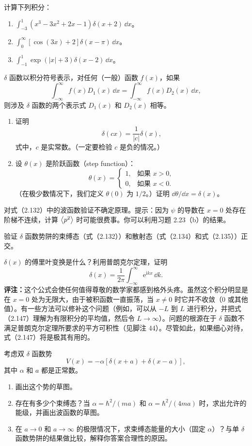计算下列积分：
\begin{enumerate}
\item $\displaystyle\int_{-3}^{1}(x^3-3x^2+2x-1)\delta(x+2)\,\dd x$。
\item $\displaystyle\int_0^{\infty}[\cos(3x)+2]\delta(x-\pi)\,\dd x$。
\item $\displaystyle\int_{-1}^{1}\exp(|x|+3)\delta(x-2)\,\dd x$。
\end{enumerate}
\vfill

$\delta$ 函数以积分符号表示，对任何（一般）函数 $f(x)$，如果
\[
\int_{-\infty}^{\infty}f(x)D_1(x)\,\dd x
=\int_{-\infty}^{\infty}f(x)D_2(x)\,\dd x,
\]
则涉及 $\delta$ 函数的两个表示式 $D_1(x)$ 和 $D_2(x)$ 相等。
\begin{enumerate}
\item 证明
\[
\delta(cx)=\frac{1}{|c|}\delta(x),
\]
式中，$c$ 是实常数。（一定要检验 $c$ 是负的情况。）
\item 设 $\theta(x)$ 是阶跃函数（step function）：
\[
\theta(x)=\begin{cases}1,&\text{如果 }x>0,\\0,&\text{如果 }x<0.\end{cases}
\]
（在极少数情况下，我们定义 $\theta(0)$ 为 $1/2$。）证明 $\dd\theta/\dd x=\delta(x)$。
\end{enumerate}
\vfill

对式（2.132）中的波函数验证不确定原理。提示：因为 $\psi$ 的导数在 $x=0$ 处存在阶梯不连续，计算 $\left\langle p^2\right\rangle$ 时可能很费事。你可以利用习题 2.23（b）的结果。
\vfill

验证 $\delta$ 函数势阱的束缚态（式（2.132））和散射态（式（2.134）和式（2.135））正交。
\vfill

$\delta(x)$ 的傅里叶变换是什么？利用普朗克尔定理，证明
\[
\delta(x)=\frac{1}{2\pi}\int_{-\infty}^{\infty}\mathrm{e}^{\mathrm{i}kx}\,\dd k.
\]
\textbf{评注：}这个公式会使任何值得尊敬的数学家都感到格外头疼。虽然这个积分明显是在 $x=0$ 处为无限大，由于被积函数一直振荡，当 $x\ne0$ 时它并不收敛（$0$ 或其他值）。有一些方法可以修补这个问题（例如，可以从 $-L$ 到 $L$ 进行积分，并把式（2.147）理解为有限积分的平均值，然后令 $L\to\infty$）。问题的根源在于 $\delta$ 函数不满足普朗克尔定理所要求的平方可积性（见脚注 44）。尽管如此，如果细心对待，式（2.147）将是极其有用的。
\vfill

考虑双 $\delta$ 函数势
\[
V(x)=-\alpha[\delta(x+a)+\delta(x-a)],
\]
其中 $\alpha$ 和 $a$ 都是正常数。
\begin{enumerate}
\item 画出这个势的草图。
\item 存在有多少个束缚态？当 $\alpha=\hbar^2/(ma)$ 和 $\alpha=\hbar^2/(4ma)$ 时，求出允许的能级，并画出波函数的草图。
\item 在 $a\to0$ 和 $a\to\infty$ 的极限情况下，求束缚态能量的大小（固定 $\alpha$）？与单 $\delta$ 函数势阱的结果做比较，解释你答案合理性的原因。
\end{enumerate}
\vfill

